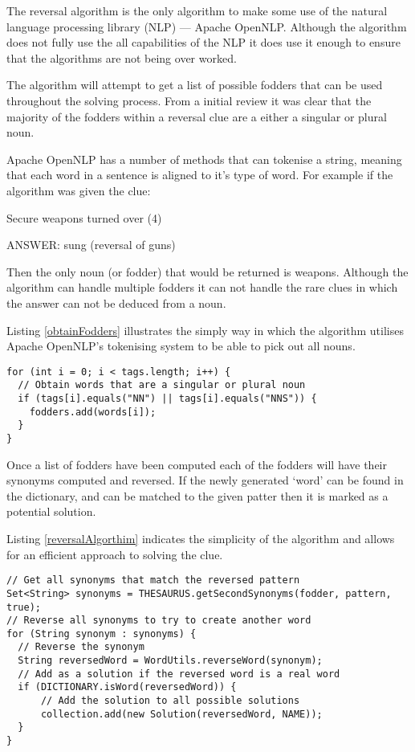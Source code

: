 The reversal algorithm is the only algorithm to make some use of the natural 
language processing library (NLP) --- Apache OpenNLP. Although the algorithm 
does not fully use the all capabilities of the NLP it does use it enough to 
ensure that the algorithms are not being over worked.

The algorithm will attempt to get a list of possible fodders that can be used 
throughout the solving process. From a initial review it was clear that the 
majority of the fodders within a reversal clue are a either a singular or plural
noun.

Apache OpenNLP has a number of methods that can tokenise a string, meaning that 
each word in a sentence is aligned to it's type of word. For example if the 
algorithm was given the clue:

Secure weapons turned over (4)

ANSWER: sung (reversal of guns)

Then the only noun (or fodder) that would be returned is weapons. Although the 
algorithm can handle multiple fodders it can not handle the rare clues in which
the answer can not be deduced from a noun.

Listing \ref{obtainFodders} illustrates the simply way in which the algorithm 
utilises Apache OpenNLP's tokenising system to be able to pick out all nouns.

\begin{lstlisting}[caption={Deducing all singular or plural nouns within the clue},
                   label=obtainFodders]  
for (int i = 0; i < tags.length; i++) {
  // Obtain words that are a singular or plural noun
  if (tags[i].equals("NN") || tags[i].equals("NNS")) {
    fodders.add(words[i]);
  }
}
\end{lstlisting}

Once a list of fodders have been computed each of the fodders will have their
synonyms computed and reversed. If the newly generated `word' can be found in 
the dictionary, and can be matched to the given patter then it is marked as a 
potential solution.

Listing \ref{reversalAlgorthim} indicates the simplicity of the algorithm and 
allows for an efficient approach to solving the clue.

\begin{lstlisting}[caption={Core reversal algorthim deducing possbile solutions},
                   label=reversalAlgorthim]  
// Get all synonyms that match the reversed pattern
Set<String> synonyms = THESAURUS.getSecondSynonyms(fodder, pattern, true);
// Reverse all synonyms to try to create another word
for (String synonym : synonyms) {
  // Reverse the synonym
  String reversedWord = WordUtils.reverseWord(synonym);
  // Add as a solution if the reversed word is a real word
  if (DICTIONARY.isWord(reversedWord)) {
      // Add the solution to all possible solutions
      collection.add(new Solution(reversedWord, NAME));
  }
}
\end{lstlisting}

